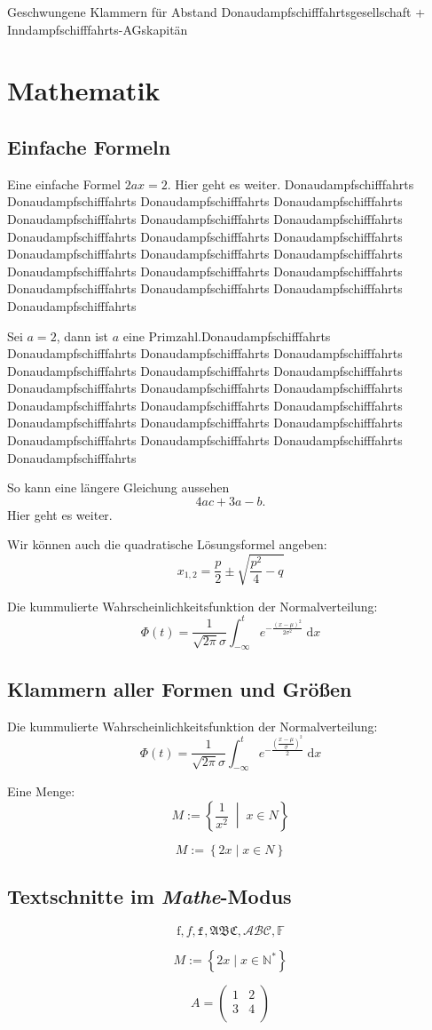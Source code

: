\documentclass[a4paper]{article}
\newcommand*{\ddsg}[2][Donau]{#1dampfschifffahrts#2}
\newcommand*{\dx}[1][x]{\;\mathrm{d}#1}
\newcommand*{\N}[1][]{\mathbb{N}^{#1}}
\begin{document}
Geschwungene Klammern für Abstand
\ddsg{gesellschaft} + \ddsg[Inn]{-AG}skapitän

\section{Mathematik}
\subsection{Einfache Formeln}
Eine einfache Formel $2 a x=2$. Hier geht es weiter. \ddsg{} \ddsg{} \ddsg{} \ddsg{}  \ddsg{} \ddsg{} \ddsg{} \ddsg{} \ddsg{} \ddsg{} \ddsg{} \ddsg{} \ddsg{} \ddsg{} \ddsg{} \ddsg{} \ddsg{} \ddsg{} \ddsg{} \ddsg{}

Sei $a = 2$, dann ist $a$ eine Primzahl.\ddsg{} \ddsg{} \ddsg{} \ddsg{}  \ddsg{} \ddsg{} \ddsg{} \ddsg{} \ddsg{} \ddsg{} \ddsg{} \ddsg{} \ddsg{} \ddsg{} \ddsg{} \ddsg{} \ddsg{} \ddsg{} \ddsg{} \ddsg{}

So kann eine längere Gleichung aussehen
\[
4ac + 3a - b.
\]
Hier geht es weiter.

Wir können auch die quadratische Lösungsformel angeben:
\[
x_{1,2} = \frac{p}{2} \pm \sqrt{\frac{p^2}{4} - q}
\]

Die kummulierte Wahrscheinlichkeitsfunktion der Normalverteilung:
\[
\Phi(t) = \frac{1}{\sqrt{2\pi}\sigma} \int_{-\infty}^{t} e^{-\frac{(x-\mu)^2}{2 \sigma^2}} \dx
\]

\subsection{Klammern aller Formen und Größen}
Die kummulierte Wahrscheinlichkeitsfunktion der Normalverteilung:
\[
\Phi(t) = \frac{1}{\sqrt{2\pi}\sigma} \int_{-\infty}^{t} e^{-\frac{\left(\dfrac{x-\mu}{\sigma}\right)^2}{2}} \dx
\]

Eine Menge:
\[
M := \left\lbrace\frac{1}{x^2} \;\middle\vert\; x\in N \right\rbrace
\]

\[
M := \left\lbrace 2x \mid x\in N \right\rbrace
\]

\subsection{Textschnitte im \emph{Mathe}-Modus}
\[
\mathrm{f},\mathit{f}, \mathtt{f}, \mathfrak{ABC}, \mathcal{ABC}, \mathbb{F}
\]

\[
M := \left\lbrace 2x \mid x\in \N[*] \right\rbrace
\]

\[
A = 
\begin{pmatrix}
1 & 2\\
3 & 4\\
\end{pmatrix}
\]
\end{document}
